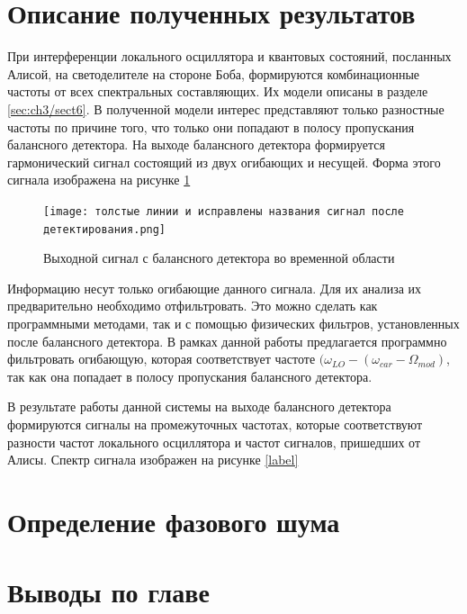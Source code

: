 \section{Описание полученных результатов}\label{sec:ch3/sect8}
При интерференции локального осциллятора и квантовых состояний, посланных Алисой, на светоделителе на стороне Боба, формируются комбинационные частоты от всех спектральных составляющих. Их модели описаны в разделе \ref*{sec:ch3/sect6}.
В полученной модели интерес представляют только разностные частоты по причине того, что только они попадают в полосу пропускания балансного детектора.
На выходе балансного детектора формируется гармонический сигнал состоящий из двух огибающих и несущей. Форма этого сигнала изображена на рисунке \ref*{fig: het true time}
\begin{figure}
    \centering
    \texttt{[image: толстые линии и исправлены названия сигнал после детектирования.png]}
    \caption*{Выходной сигнал с балансного детектора во временной области}
    \label{fig: het true time}
\end{figure}
Информацию несут только огибающие данного сигнала. Для их анализа их предварительно необходимо отфильтровать. Это можно сделать как программными методами, так и с помощью физических фильтров, установленных после балансного детектора.
В рамках данной работы предлагается программно фильтровать огибающую, которая соответствует частоте $(\omega_{LO} -(\omega_{car} - \Omega_{mod})$, так как она попадает в полосу пропускания балансного детектора. 

В результате работы данной системы на выходе балансного детектора формируются сигналы на промежуточных частотах, которые соответствуют разности частот локального осциллятора и частот сигналов, пришедших от Алисы. Спектр сигнала изображен на рисунке \ref*{label}
\section{Определение фазового шума}\label{sec:ch3/sect9}

\section{Выводы по главе}\label{sec:ch3/sect10}